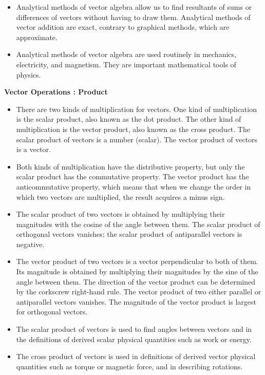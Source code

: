 \documentclass[12pt,addpoints]{exam}
\begin{document}
\begin{questions}
\begin{itemize}
			\item Analytical methods of vector algebra allow us to find resultants of sums or differences of vectors without having to draw them. Analytical methods of vector addition are exact, contrary to graphical methods, which are approximate.
			\item Analytical methods of vector algebra are used routinely in mechanics, electricity, and magnetism. They are important mathematical tools of physics.
	   \end{itemize}
	   \begin{center}
		\textbf{Vector Operations : Product} 
	   \end{center}
   	   \begin{itemize}
   	   	\item There are two kinds of multiplication for vectors. One kind of multiplication is the scalar product, also known as the dot product. The other kind of multiplication is the vector product, also known as the cross product. The scalar product of vectors is a number (scalar). The vector product of vectors is a vector.
   	   	\item Both kinds of multiplication have the distributive property, but only the scalar product has the commutative property. The vector product has the anticommutative property, which means that when we change the order in which two vectors are multiplied, the result acquires a minus sign.
   	   	\item The scalar product of two vectors is obtained by multiplying their magnitudes with the cosine of the angle between them. The scalar product of orthogonal vectors vanishes; the scalar product of antiparallel vectors is negative.
   	   	\item The vector product of two vectors is a vector perpendicular to both of them. Its magnitude is obtained by multiplying their magnitudes by the sine of the angle between them. The direction of the vector product can be determined by the corkscrew right-hand rule. The vector product of two either parallel or antiparallel vectors vanishes. The magnitude of the vector product is largest for orthogonal vectors.
   	   	\item The scalar product of vectors is used to find angles between vectors and in the definitions of derived scalar physical quantities such as work or energy.
   	   	\item The cross product of vectors is used in definitions of derived vector physical quantities such as torque or magnetic force, and in describing rotations.

\end{itemize}
\end{questions}
\end{document}
